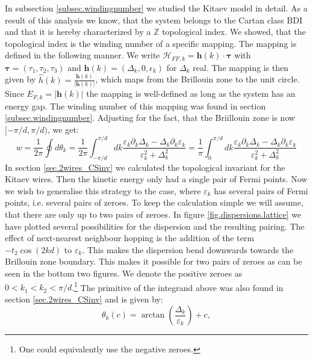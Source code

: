 In subsection \ref{subsec.windingnumber} we studied the Kitaev model in detail. As a result of this analysis we know, that the system belongs to the Cartan class BDI and that it is hereby characterized by a $\mathbb{Z}$ topological index. We showed, that the topological index is the winding number of a specific mapping. The mapping is defined in the following manner. We write $\mathcal{H}_{FF,k} = \mathbf{h}(k)\cdot \boldsymbol\tau$ with $\boldsymbol\tau = (\tau_1, \tau_2, \tau_3)$ and $\mathbf{h}(k) = (\Delta_k, 0, \epsilon_k)$ for $\Delta_k$ real. The mapping is then given by $\hat{h}(k) = \frac{\mathbf{h}(k)}{|\mathbf{h}(k)|}$, which maps from the Brillouin zone to the unit circle. Since $E_{F,k} = |\mathbf{h}(k)|$ the mapping is well-defined as long as the system has an energy gap. The winding number of this mapping was found in section \ref{subsec.windingnumber}. Adjusting for the fact, that the Briillouin zone is now $[-\pi/d, \pi/d)$, we get:
\begin{equation}
w = \frac{1}{2\pi}\oint d\theta_k = \frac{1}{2\pi}\int_{-\pi/d}^{\pi/d} dk \frac{\varepsilon_k\partial_k\Delta_k - \Delta_k\partial_k\varepsilon_k}{\varepsilon^2_k + \Delta^2_k} = \frac{1}{\pi}\int_{0}^{\pi/d} dk \frac{\varepsilon_k\partial_k\Delta_k - \Delta_k\partial_k\varepsilon_k}{\varepsilon^2_k + \Delta^2_k}
\label{eq.windingnumber.kitaevmodel}
\end{equation} 
In section \ref{sec.2wires_CSinv} we calculated the topological invariant for the Kitaev wires. Then the kinetic energy only had a single pair of Fermi points. Now we wish to generalise this strategy to the case, where $\varepsilon_k$ has several pairs of Fermi points, i.e. several pairs of zeroes. To keep the calculation simple we will assume, that there are only up to two pairs of zeroes. In figure \ref{fig.dispersions.lattice} we have plotted several possibilities for the dispersion and the resulting pairing. The effect of next-nearest neighbour hopping is the addition of the term $-t_2\cos(2kd)$ to $\varepsilon_k$. This makes the dispersion bend downwards towards the Brillouin zone boundary. This makes it possible for two pairs of zeroes as can be seen in the bottom two figures. We denote the positive zeroes as $0 < k_1 < k_2 < \pi / d$.\footnote{One could equivalently use the negative zeroes.} The primitive of the integrand above was also found in section \ref{sec.2wires_CSinv} and is given by:
\begin{equation}
\theta_k(c) = \arctan\left(\frac{\Delta_k}{\varepsilon_k}\right) + c, \nonumber
\end{equation}
